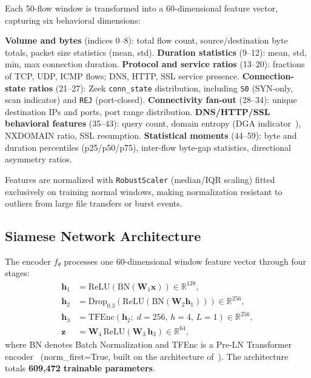 \documentclass[journal,10pt,twoside]{IEEEtran}
\newcommand{\R}{\mathbb{R}}
\begin{document}
Each 50-flow window is transformed into a 60-dimensional feature vector,
capturing six behavioral dimensions:

\textbf{Volume and bytes} (indices 0--8): total flow count, source/destination
byte totals, packet size statistics (mean, std).
\textbf{Duration statistics} (9--12): mean, std, min, max connection duration.
\textbf{Protocol and service ratios} (13--20): fractions of TCP, UDP, ICMP
flows; DNS, HTTP, SSL service presence.
\textbf{Connection-state ratios} (21--27): Zeek \texttt{conn\_state}
distribution, including \texttt{S0} (SYN-only, scan indicator) and
\texttt{REJ} (port-closed).
\textbf{Connectivity fan-out} (28--34): unique destination IPs and ports, port
range distribution.
\textbf{DNS/HTTP/SSL behavioral features} (35--43): query count, domain
entropy (DGA indicator~\cite{antonakakis2017mirai}), NXDOMAIN ratio, SSL
resumption.
\textbf{Statistical moments} (44--59): byte and duration percentiles
(p25/p50/p75), inter-flow byte-gap statistics, directional asymmetry ratios.

Features are normalized with \texttt{RobustScaler} (median/IQR scaling) fitted
exclusively on training normal windows, making normalization resistant to
outliers from large file transfers or burst events.

\subsection{Siamese Network Architecture}

The encoder $f_\theta$ processes one 60-dimensional window feature vector
through four stages:
\begin{align}
  \mathbf{h}_1 &= \text{ReLU}\!\left(\text{BN}(\mathbf{W}_1 \mathbf{x})\right)
    \in \R^{128}, \label{eq:h1} \\
  \mathbf{h}_2 &= \text{Drop}_{0.3}\!\left(\text{ReLU}(\text{BN}(\mathbf{W}_2
    \mathbf{h}_1))\right) \in \R^{256}, \label{eq:h2} \\
  \mathbf{h}_3 &= \text{TFEnc}(\mathbf{h}_2;\;d{=}256,\,h{=}4,\,L{=}1)
    \in \R^{256}, \label{eq:h3} \\
  \mathbf{z}   &= \mathbf{W}_4\,\text{ReLU}(\mathbf{W}_3\,\mathbf{h}_3)
    \in \R^{64}, \label{eq:z}
\end{align}
where BN denotes Batch Normalization and TFEnc is a
Pre-LN Transformer encoder~\cite{xiong2020preln} (norm\_first=True, built on
the architecture of~\cite{vaswani2017attention}).
The architecture totals \textbf{609{,}472 trainable parameters}.
\end{document}
